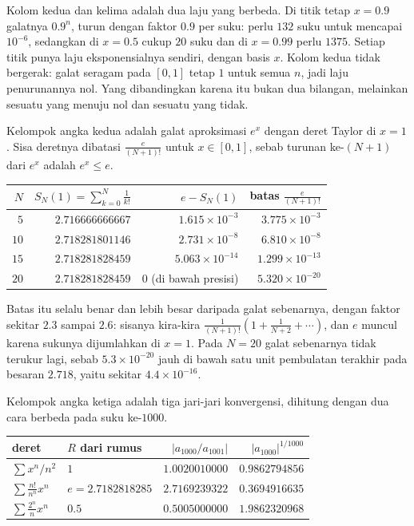 Kolom kedua dan kelima adalah dua laju yang berbeda. Di titik tetap $x=0.9$
galatnya $0.9^n$, turun dengan faktor $0.9$ per suku: perlu $132$ suku untuk
mencapai $10^{-6}$, sedangkan di $x=0.5$ cukup $20$ suku dan di $x=0.99$ perlu
$1375$. Setiap titik punya laju eksponensialnya sendiri, dengan basis $x$. Kolom
kedua tidak bergerak: galat seragam pada $[0,1]$ tetap $1$ untuk semua $n$, jadi
laju penurunannya nol. Yang dibandingkan karena itu bukan dua bilangan,
melainkan sesuatu yang menuju nol dan sesuatu yang tidak.

Kelompok angka kedua adalah galat aproksimasi $e^{x}$ dengan deret Taylor di
$x=1$. Sisa deretnya dibatasi $\frac{e}{(N+1)!}$ untuk $x\in[0,1]$, sebab
turunan ke-$(N+1)$ dari $e^x$ adalah $e^x\le e$.

\begin{center}
\small
\begin{tabular}{rrrr}
\hline
$N$ & $S_N(1)=\sum_{k=0}^{N}\frac{1}{k!}$ & $e-S_N(1)$ & batas $\frac{e}{(N+1)!}$\\
\hline
$5$  & $2.716666666667$ & $1.615\times10^{-3}$ & $3.775\times10^{-3}$\\
$10$ & $2.718281801146$ & $2.731\times10^{-8}$ & $6.810\times10^{-8}$\\
$15$ & $2.718281828459$ & $5.063\times10^{-14}$ & $1.299\times10^{-13}$\\
$20$ & $2.718281828459$ & $0$ (di bawah presisi) & $5.320\times10^{-20}$\\
\hline
\end{tabular}
\end{center}

Batas itu selalu benar dan lebih besar daripada galat sebenarnya, dengan faktor
sekitar $2.3$ sampai $2.6$: sisanya kira-kira
$\frac{1}{(N+1)!}\left(1+\frac{1}{N+2}+\cdots\right)$, dan $e$ muncul karena
sukunya dijumlahkan di $x=1$. Pada $N=20$ galat sebenarnya tidak terukur lagi,
sebab $5.3\times10^{-20}$ jauh di bawah satu unit pembulatan terakhir pada
besaran $2.718$, yaitu sekitar $4.4\times10^{-16}$.

Kelompok angka ketiga adalah tiga jari-jari konvergensi, dihitung dengan dua
cara berbeda pada suku ke-$1000$.

\begin{center}
\small
\begin{tabular}{llrr}
\hline
deret & $R$ dari rumus & $|a_{1000}/a_{1001}|$ & $|a_{1000}|^{1/1000}$\\
\hline
$\sum x^n/n^2$          & $1$              & $1.0020010000$ & $0.9862794856$\\
$\sum \frac{n!}{n^n}x^n$ & $e=2.7182818285$ & $2.7169239322$ & $0.3694916635$\\
$\sum \frac{2^n}{n}x^n$  & $0.5$            & $0.5005000000$ & $1.9862320968$\\
\hline
\end{tabular}
\end{center}

